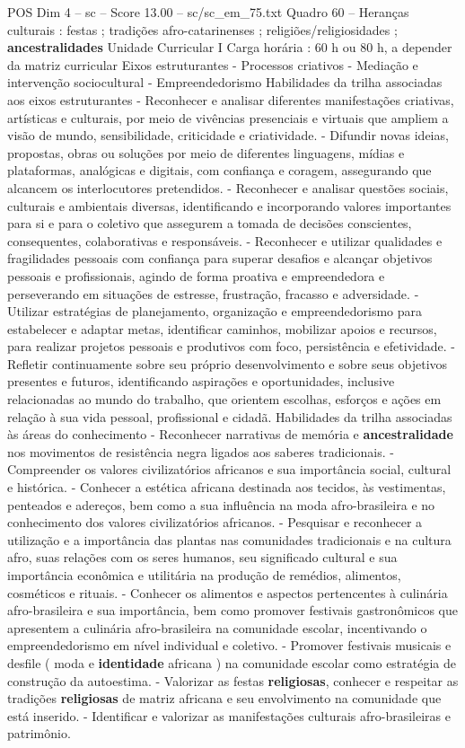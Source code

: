 \begin{textsample}{POS Dim 4 – sc – Score 13.00 – sc/sc\_em\_75.txt}
Quadro 60 – Heranças culturais : festas ; tradições afro-catarinenses ; religiões/religiosidades ; \textbf{ancestralidades} Unidade Curricular I Carga horária : 60 h ou 80 h, a depender da matriz curricular Eixos estruturantes - Processos criativos - Mediação e intervenção sociocultural - Empreendedorismo Habilidades da trilha associadas aos eixos estruturantes - Reconhecer e analisar diferentes manifestações criativas, artísticas e culturais, por meio de vivências presenciais e virtuais que ampliem a visão de mundo, sensibilidade, criticidade e criatividade. - Difundir novas ideias, propostas, obras ou soluções por meio de diferentes linguagens, mídias e plataformas, analógicas e digitais, com confiança e coragem, assegurando que alcancem os interlocutores pretendidos. - Reconhecer e analisar questões sociais, culturais e ambientais diversas, identificando e incorporando valores importantes para si e para o coletivo que assegurem a tomada de decisões conscientes, consequentes, colaborativas e responsáveis. - Reconhecer e utilizar qualidades e fragilidades pessoais com confiança para superar desafios e alcançar objetivos pessoais e profissionais, agindo de forma proativa e empreendedora e perseverando em situações de estresse, frustração, fracasso e adversidade. - Utilizar estratégias de planejamento, organização e empreendedorismo para estabelecer e adaptar metas, identificar caminhos, mobilizar apoios e recursos, para realizar projetos pessoais e produtivos com foco, persistência e efetividade. - Refletir continuamente sobre seu próprio desenvolvimento e sobre seus objetivos presentes e futuros, identificando aspirações e oportunidades, inclusive relacionadas ao mundo do trabalho, que orientem escolhas, esforços e ações em relação à sua vida pessoal, profissional e cidadã.
Habilidades da trilha associadas às áreas do conhecimento - Reconhecer narrativas de memória e \textbf{ancestralidade} nos movimentos de resistência negra ligados aos saberes tradicionais. - Compreender os valores civilizatórios africanos e sua importância social, cultural e histórica. - Conhecer a estética africana destinada aos tecidos, às vestimentas, penteados e adereços, bem como a sua influência na moda afro-brasileira e no conhecimento dos valores civilizatórios africanos. - Pesquisar e reconhecer a utilização e a importância das plantas nas comunidades tradicionais e na cultura afro, suas relações com os seres humanos, seu significado cultural e sua importância econômica e utilitária na produção de remédios, alimentos, cosméticos e rituais. - Conhecer os alimentos e aspectos pertencentes à culinária afro-brasileira e sua importância, bem como promover festivais gastronômicos que apresentem a culinária afro-brasileira na comunidade escolar, incentivando o empreendedorismo em nível individual e coletivo. - Promover festivais musicais e desfile ( moda e \textbf{identidade} africana ) na comunidade escolar como estratégia de construção da autoestima. - Valorizar as festas \textbf{religiosas}, conhecer e respeitar as tradições \textbf{religiosas} de matriz africana e seu envolvimento na comunidade que está inserido. - Identificar e valorizar as manifestações culturais afro-brasileiras e patrimônio.

\end{textsample}

